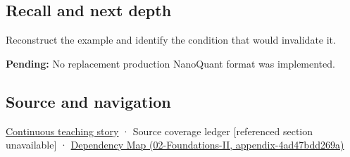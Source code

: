 \subsection{Recall and next depth}\label{appendix-590bbb2424c1-recall-and-next-depth}

Reconstruct the example and identify the condition that would invalidate it.

\textbf{Pending:} No replacement production NanoQuant format was implemented.

\subsection{Source and navigation}\label{appendix-590bbb2424c1-source-and-navigation}

\hyperref[01-foundations-i-ch002-bytes-become-a-durable-agreement]{Continuous teaching story} · {Source coverage ledger {[}referenced section unavailable{]}} · \href{../02-Foundations-II/main.pdf\#nameddest=appendix-4ad47bdd269a}{Dependency Map (02-Foundations-II, appendix-4ad47bdd269a)}
